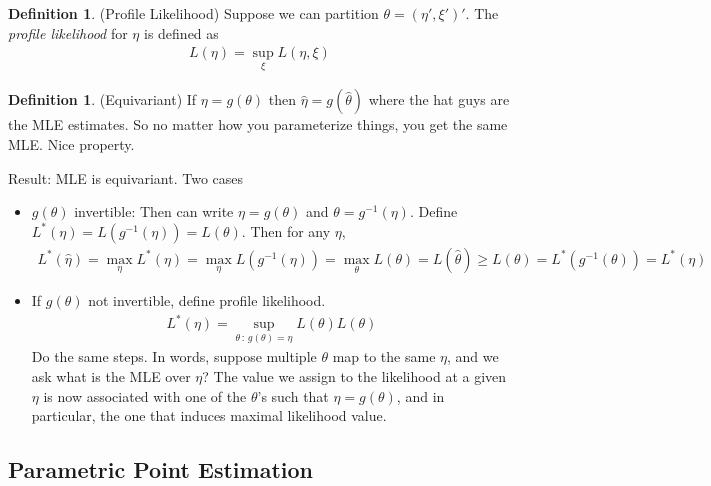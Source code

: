 \documentclass[12pt]{article}
\theoremstyle{plain}
\theoremstyle{definition}
\newtheorem{defn}[thm]{Definition}
\theoremstyle{remark}
\begin{document}
\begin{defn}
(Profile Likelihood)
Suppose we can partition $\theta=(\eta',\xi')'$.
The \emph{profile likelihood} for $\eta$ is defined as
\begin{align*}
  L(\eta) = \sup_\xi L(\eta,\xi)
\end{align*}
\end{defn}

\begin{defn}(Equivariant)
If $\eta=g(\theta)$ then $\hat{\eta}=g(\hat{\theta})$ where the hat
guys are the MLE estimates.
So no matter how you parameterize things, you get the same MLE. Nice
property.
\end{defn}


Result: MLE is equivariant.
Two cases
\begin{itemize}
  \item $g(\theta)$ invertible:
    Then can write $\eta=g(\theta)$ and $\theta=g^{-1}(\eta)$.
    Define $L^*(\eta)=L(g^{-1}(\eta))=L(\theta)$.
    Then for any $\eta$,
    \begin{align*}
      L^*(\hat{\eta})
      =
      \max_\eta
      L^*(\eta)
      =
      \max_\eta
      L(g^{-1}(\eta))
      =
      \max_\theta
      L(\theta)
      =
      L(\hat{\theta})
      \geq
      L(\theta)
      =
      L^*(g^{-1}(\theta))
      =
      L^*(\eta)
    \end{align*}
  \item If $g(\theta)$ not invertible, define
    profile likelihood.
    \begin{align*}
      L^*(\eta) =
      \sup_{\theta\,:\,g(\theta)=\eta}
      L(\theta)
      L(\theta)
    \end{align*}
    Do the same steps.
    In words, suppose multiple $\theta$ map to the same $\eta$, and we
    ask what is the MLE over $\eta$?
    The value we assign to the likelihood at a given $\eta$ is now
    associated with one of the $\theta$'s such that $\eta=g(\theta)$,
    and in particular, the one that induces maximal likelihood value.
\end{itemize}



\subsection{Parametric Point Estimation}
\end{document}
